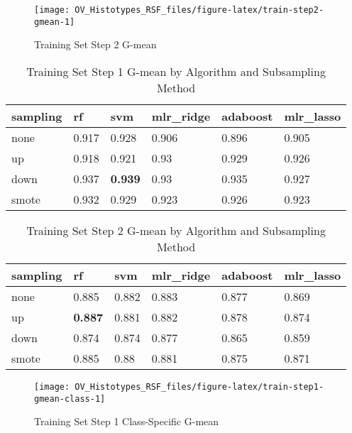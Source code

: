 \documentclass[
]{report}
\begin{document}
\begin{figure}[H]

{\centering \texttt{[image: OV\_Histotypes\_RSF\_files/figure-latex/train-step2-gmean-1]} 

}

\caption{Training Set Step 2 G-mean}\label{fig:train-step2-gmean}
\end{figure}

\begin{table}

\caption{\label{tab:train-step1-gmean-table}Training Set Step 1 G-mean by Algorithm and Subsampling Method}
\centering
\begin{tabular}[t]{l|l|l|l|l|l}
\hline
sampling & rf & svm & mlr\_ridge & adaboost & mlr\_lasso\\
\hline
none & 0.917 & 0.928 & 0.906 & 0.896 & 0.905\\
\hline
up & 0.918 & 0.921 & 0.93 & 0.929 & 0.926\\
\hline
down & 0.937 & \textbf{0.939} & 0.93 & 0.935 & 0.927\\
\hline
smote & 0.932 & 0.929 & 0.923 & 0.926 & 0.923\\
\hline
\end{tabular}
\end{table}

\begin{table}

\caption{\label{tab:train-step2-gmean-table}Training Set Step 2 G-mean by Algorithm and Subsampling Method}
\centering
\begin{tabular}[t]{l|l|l|l|l|l}
\hline
sampling & rf & svm & mlr\_ridge & adaboost & mlr\_lasso\\
\hline
none & 0.885 & 0.882 & 0.883 & 0.877 & 0.869\\
\hline
up & \textbf{0.887} & 0.881 & 0.882 & 0.878 & 0.874\\
\hline
down & 0.874 & 0.874 & 0.877 & 0.865 & 0.859\\
\hline
smote & 0.885 & 0.88 & 0.881 & 0.875 & 0.871\\
\hline
\end{tabular}
\end{table}

\begin{figure}[H]

{\centering \texttt{[image: OV\_Histotypes\_RSF\_files/figure-latex/train-step1-gmean-class-1]} 

}

\caption{Training Set Step 1 Class-Specific G-mean}\label{fig:train-step1-gmean-class}
\end{figure}
\end{document}
